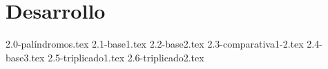 \part{Desarrollo}

\setcounter{section}{-1}

{2.0-palíndromos.tex}
\newpage
{2.1-base1.tex}
\newpage
{2.2-base2.tex}
\newpage
{2.3-comparativa1-2.tex}
\newpage
{2.4-base3.tex}
\newpage
{2.5-triplicado1.tex}
\newpage
{2.6-triplicado2.tex}


\newpage